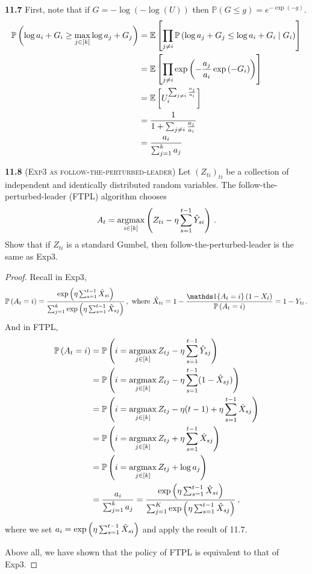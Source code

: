 \noindent\textbf{11.7} First, note that if $G=-\log (-\log (U))$ then $\mathbb{P}(G \leq g)=e^{-\exp (-g)}$.
\begin{equation}
    \begin{aligned}
        \mathbb{P}\left(\log a_{i}+G_{i} \geq \max _{j \in[k]} \log a_{j}+G_{j}\right) &=\mathbb{E}\left[\prod_{j \neq i} \mathbb{P}\left(\log a_{j}+G_{j} \leq \log a_{i}+G_{i} \mid G_{i}\right)\right] \notag\\
        &=\mathbb{E}\left[\prod_{j \neq i} \exp \left(-\frac{a_{j}}{a_{i}} \exp \left(-G_{i}\right)\right)\right] \notag\\
        &=\mathbb{E}\left[U_{i}^{\sum_{j \neq i} \frac{a_{j}}{a_{i}}}\right] \notag\\
        &=\frac{1}{1+\sum_{j \neq i} \frac{a_{j}}{a_{i}}} \notag\\
        &=\frac{a_{i}}{\sum_{j=1}^{k} a_{j}}\notag
        \end{aligned}
\end{equation}

\noindent\textbf{11.8} (\textsc{Exp3 as follow-the-perturbed-leader}) Let $(Z_{ti})_{ti}$ be a collection of independent and identically distributed random variables. The follow-the-perturbed-leader (FTPL) algorithm chooses
\begin{align*}
A_{t}=\operatorname*{argmax}_{i \in[k]}\left(Z_{ti}-\eta \sum_{s=1}^{t-1} \hat{Y}_{s i}\right)\,.
\end{align*}
Show that if $Z_{ti}$ is a standard Gumbel, then follow-the-perturbed-leader is the same as Exp3. 
\begin{proof}
Recall in Exp3, 
\begin{align*}
    \PP{A_t=i} = \frac{\exp\bracket{\eta \sum_{s=1}^{t-1} \hat{X}_{si} }}{\sum_{j=1}^k \exp\bracket{\eta \sum_{s=1}^{t-1} \hat{X}_{sj} }} \,, \text{ where } \hat{X}_{ti} = 1-\frac{ \bOne{A_t=i}(1-X_t) }{\PP{A_t=i} } = 1-Y_{ti}\,. 
 \end{align*}
 And in FTPL, 
 \begin{align*}
\mathbb{P} \left(A_t=i\right) &= \mathbb{P} \left( i =\operatorname*{argmax}_{j\in[k]} Z_{tj}-\eta \sum_{s=1}^{t-1} \hat{Y}_{sj}\right) \\
&= \mathbb{P} \left( i = \operatorname*{argmax}_{j\in[k]}Z_{tj}-\eta \sum_{s=1}^{t-1} (1-\hat{X}_{sj})  \right) \\
&= \mathbb{P} \left( i = \operatorname*{argmax}_{j\in[k]}Z_{tj}- \eta(t-1)+ \eta \sum_{s=1}^{t-1} \hat{X}_{sj}  \right) \\
&= \mathbb{P} \left( i = \operatorname*{argmax}_{j\in[k]}Z_{tj}+ \eta \sum_{s=1}^{t-1} \hat{X}_{sj}  \right) \\
&= \mathbb{P} \left( i = \operatorname*{argmax}_{j\in[k]}Z_{tj}+ \log a_j  \right)  \\
&= \frac{a_i}{\sum_{j=1}^k a_j} = \frac{\exp\left(\eta \sum_{s=1}^{t-1} \hat{X}_{si} \right)}{\sum_{j=1}^K \exp\left(\eta \sum_{s=1}^{t-1} \hat{X}_{sj} \right)} \,,
 \end{align*}
 where we set $a_i = \exp\left(\eta \sum_{s=1}^{t-1}\hat{X}_{si}\right)$ and apply the result of 11.7. 

 Above all, we have shown that the policy of FTPL is equivalent to that of Exp3. 


\end{proof}

